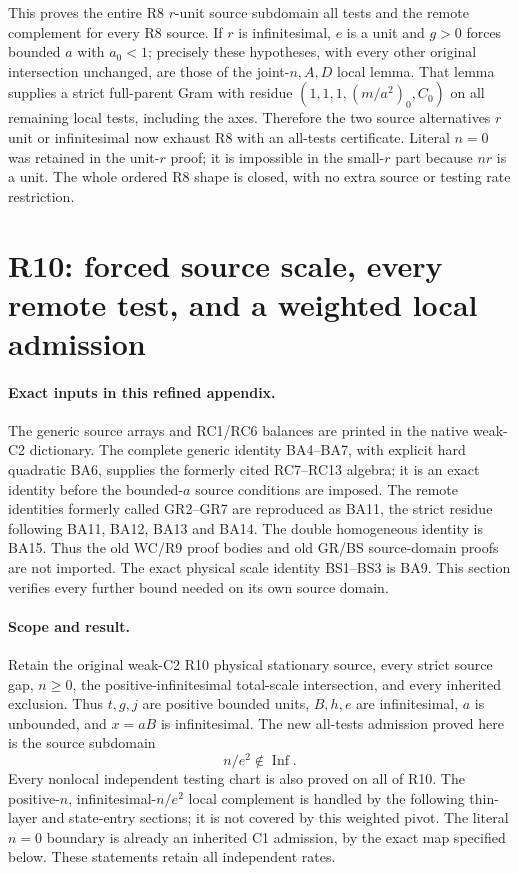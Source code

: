 This proves the entire R8 $r$-unit source subdomain all tests and
the remote complement for every R8 source.  If $r$ is infinitesimal,
$e$ is a unit and $g>0$ forces bounded $a$ with $a_0<1$; precisely
these hypotheses, with every other original intersection unchanged,
are those of the joint-$n,A,D$ local lemma.  That lemma supplies a
strict full-parent Gram with residue $(1,1,1,(m/a^2)_0,C_0)$ on
all remaining local tests, including the axes.  Therefore the two
source alternatives $r$ unit or infinitesimal now exhaust R8 with
an all-tests certificate.  Literal $n=0$ was retained in the unit-$r$
proof; it is impossible in the small-$r$ part because $nr$ is a unit.
The whole ordered R8 shape is closed, with no extra source or testing
rate restriction.


\section{\texorpdfstring{R10: forced source scale, every remote test, and a weighted local admission}{R10: forced source scale, every remote test, and a weighted local admission}}
\label{component:p9ee4ba7326a7}


\paragraph{Exact inputs in this refined appendix.}
The generic source arrays and RC1/RC6 balances are printed in the native
weak-C2 dictionary. The complete generic identity BA4--BA7, with explicit
hard quadratic BA6, supplies the formerly cited RC7--RC13 algebra; it is
an exact identity before the bounded-$a$ source conditions are imposed.
The remote identities formerly called GR2--GR7 are reproduced as BA11,
the strict residue following BA11, BA12, BA13 and BA14. The double
homogeneous identity is BA15. Thus the old WC/R9 proof bodies and old
GR/BS source-domain proofs are not imported. The exact physical scale
identity BS1--BS3 is BA9. This section verifies every further bound
needed on its own source domain.


\paragraph{Scope and result.}
Retain the original weak-C2 R10 physical stationary source, every strict
source gap, $n\ge0$, the positive-infinitesimal total-scale intersection,
and every inherited exclusion. Thus $t,g,j$ are positive bounded units,
$B,h,e$ are infinitesimal, $a$ is unbounded, and $x=aB$ is infinitesimal.
The new all-tests admission proved here is the source subdomain
\[
                         n/e^2\notin\operatorname{Inf}.
\tag{R10.1}
\]
Every nonlocal independent testing chart is also proved on all of R10.
The positive-$n$, infinitesimal-$n/e^2$ local complement is handled by the following thin-layer and state-entry sections; it is not covered by this weighted pivot.
The literal $n=0$ boundary is already an inherited C1 admission, by the
exact map specified below. These statements retain all independent rates.

